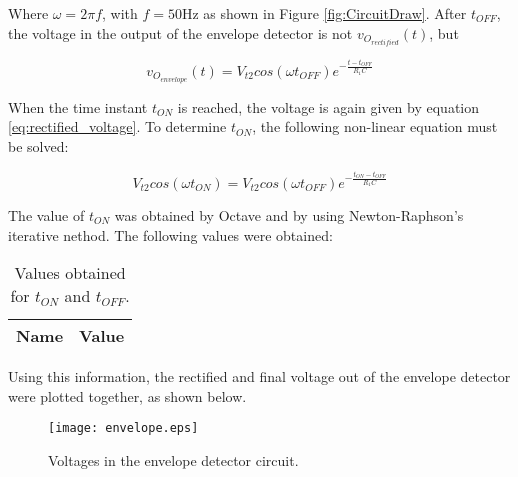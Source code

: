 Where $\omega=2\pi f$, with $f=50$Hz as shown in Figure \ref{fig:CircuitDraw}. After $t_{OFF}$, the voltage in the output of the envelope detector is not $v_{O_{rectified}}(t)$, but

\begin{equation} \label{eq:exponential_voltage}
  v_{O_{envelope}}(t)=V_{t2}cos(\omega t_{OFF})e^{-\frac{t-t_{OFF}}{R_1C}}
\end{equation}

When the time instant $t_{ON}$ is reached, the voltage is again given by equation \ref{eq:rectified_voltage}. To determine $t_{ON}$, the following non-linear equation must be solved:

\begin{equation} \label{eq:non_linear_equation_tON}
  V_{t2}cos(\omega t_{ON})=V_{t2}cos(\omega t_{OFF})e^{-\frac{t_{ON}-t_{OFF}}{R_1 C}}
\end{equation}

The value of $t_{ON}$ was obtained by Octave and by using Newton-Raphson's iterative nethod. The following values were obtained:

\begin{table}[H]
  \centering
  \begin{tabular}{|c|c|}
    \hline    
    {\bf Name} & {\bf Value} \\ \hline
    
  \end{tabular}
  \caption{Values obtained for $t_{ON}$ and $t_{OFF}$.}
  \label{tab:tON_tOFF}
\end{table}

Using this information, the rectified and final voltage out of the envelope detector were plotted together, as shown below.


\begin{figure}[H] \centering
  \texttt{[image: envelope.eps]}
  \caption{Voltages in the envelope detector circuit.}
  \label{fig:envelope_voltages}
\end{figure}
